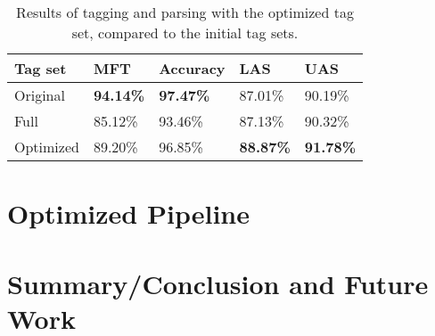 \documentclass[11pt,a4paper]{article}
\begin{document}
\begin{table}
    \centering
    \smaller[0.5]
    \begin{tabular}{@{}lllll@{}}
        \toprule
        \textbf{Tag set} & \textbf{MFT} & \textbf{Accuracy} &
        \textbf{LAS} & \textbf{UAS} \\
        \midrule
        Original & \textbf{94.14\%} & \textbf{97.47\%} & 87.01\% & 90.19\% \\
        Full & 85.12\% & 93.46\% & 87.13\% & 90.32\% \\
        Optimized & 89.20\% & 96.85\% & \textbf{88.87\%} & \textbf{91.78\%} \\
        \bottomrule
    \end{tabular}
    \caption{Results of tagging and parsing with the optimized tag set, compared to
        the initial tag sets.}
    \label{finalresults}
\end{table}

\section{Optimized Pipeline}
\label{sec:pipeline}

\section{Summary/Conclusion and Future Work}
\label{sec:summary}




\end{document}
